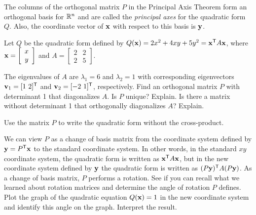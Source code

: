 The columns of the orthogonal matrix $P$ in the Principal Axis Theorem form an orthogonal basis for $\mathbb{R}^n$ and are called the \emph{principal axes} for the quadratic form $Q$. Also, the coordinate vector of $\mathbf{x}$ with respect to this basis is $\mathbf{y}$.

\begin{activity} Let $Q$ be the quadratic form defined by $Q(\mathbf{x}) = 2x^2 + 4xy + 5y^2 = \mathbf{x}^{\mathsf{T}} A \mathbf{x}$, where $\mathbf{x} = \left[ \begin{array}{c} x \\ y \end{array} \right]$ and $A = \left[ \begin{array}{cc}2&2\\2&5 \end{array} \right]$. 
    \ba


    \item The eigenvalues of $A$ are $\lambda_1 = 6$ and $\lambda_2=1$ with corresponding eigenvectors $\vv_1 = [1 \ 2]^{\tr}$ and $\vv_2 = [-2 \ 1]^{\tr}$, respectively. Find an orthogonal matrix $P$ with determinant 1 that diagonalizes $A$. Is $P$ unique? Explain. Is there a matrix without determinant 1 that orthogonally diagonalizes $A$? Explain.

    
    \item Use the matrix $P$ to write the quadratic form without the cross-product.

    \item We can view $P$ as a change of basis matrix from the coordinate system defined by $\mathbf{y} = P^{\mathsf{T}} \mathbf{x}$ to the standard coordinate system. In other words, in the standard $xy$ coordinate system, the quadratic form is written as $\mathbf{x}^{\mathsf{T}}A \mathbf{x}$, but in the new coordinate system defined by $\mathbf{y}$ the quadratic form is written as $(P\mathbf{y})^{\mathsf{T}}A(P\mathbf{y})$. As a change of basis matrix, $P$ performs a rotation. See if you can recall what we learned about rotation matrices and determine the angle of rotation $P$ defines. Plot the graph of the quadratic equation $Q(\mathbf{x}) = 1$ in the new coordinate system and identify this angle on the graph. Interpret the result.

    \ea

\end{activity}


